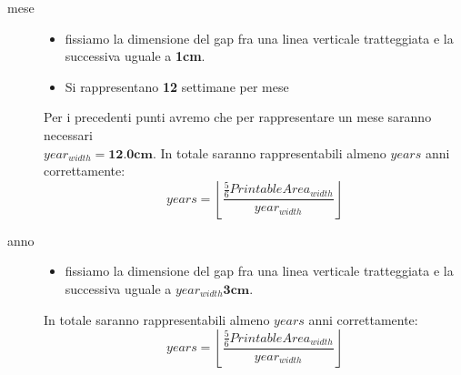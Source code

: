 \begin{description}
\item[mese] \quad
\begin{itemize}
  \item fissiamo la dimensione del gap fra una linea verticale tratteggiata
e la successiva uguale a \textbf{1cm}.
  \item Si rappresentano \textbf{12} settimane per mese
\end{itemize}

Per i precedenti punti avremo che per rappresentare un mese saranno
necessari\\ $year_{width} = \textbf{12.0cm}$. In totale saranno rappresentabili 
almeno $years$ anni correttamente:
\begin{displaymath}
	years = \left \lfloor \frac{ \frac{5}{6}PrintableArea_{width}
	}{year_{width}}\right \rfloor
\end{displaymath}


\item[anno] \quad
\begin{itemize}
  \item fissiamo la dimensione del gap fra una linea verticale tratteggiata
e la successiva uguale a $year_{width}\textbf{3cm}$.
\end{itemize}

In totale saranno rappresentabili almeno $years$ anni correttamente:
\begin{displaymath}
	years = \left \lfloor \frac{\frac{5}{6}PrintableArea_{width}
	}{year_{width}}\right \rfloor
\end{displaymath}

\end{description}

